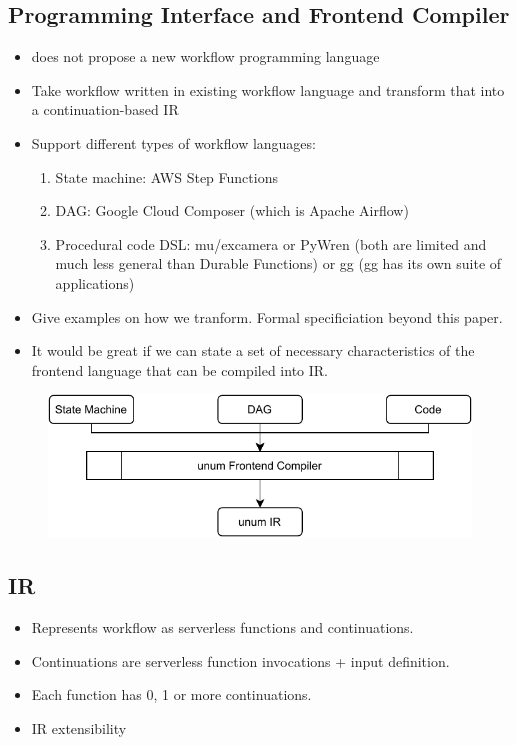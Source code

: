 \subsection{Programming Interface and Frontend Compiler}

\begin{itemize}
	\item \name{} does not propose a new workflow programming language
	\item Take workflow written in existing workflow language and transform
	that into a continuation-based IR
	\item Support different types of workflow languages:

		\begin{enumerate}
			\item State machine: AWS Step Functions
			\item DAG: Google Cloud Composer (which is Apache Airflow)
			\item Procedural code DSL: mu/excamera or PyWren (both are limited and
			much less general than Durable Functions) or gg (gg has its own suite
			of applications)
		\end{enumerate}

	\item Give examples on how we tranform. Formal specificiation beyond this paper.
	\item It would be great if we can state a set of necessary characteristics
	of the frontend language that can be compiled into \name{} IR.
\end{itemize}

\begin{figure}[t!]
    \centering
    \includegraphics[width=\columnwidth]{figures/unum-frontends.pdf}
\end{figure}

\subsection{\name{} IR}

\begin{itemize}
	\item Represents workflow as serverless functions and continuations.
	\item Continuations are serverless function invocations + input definition.
	\item Each function has 0, 1 or more continuations.
	\item IR extensibility
\end{itemize}
 


